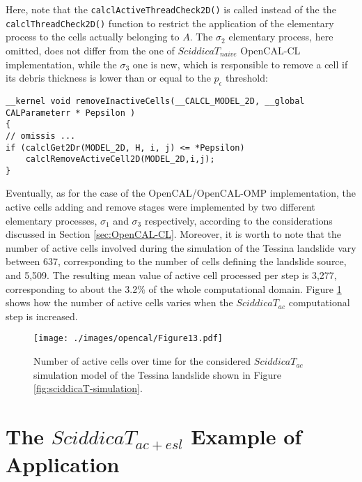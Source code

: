 \noindent Here, note that the \verb'calclActiveThreadCheck2D()' is
called instead of the the \verb'calclThreadCheck2D()' function to
restrict the application of the elementary process to the cells
actually belonging to $A$. The $\sigma_2$ elementary process, here
omitted, does not differ from the one of $SciddicaT_{naive}$
OpenCAL-CL implementation, while the $\sigma_3$ one is new, which
is responsible to remove a cell if its debris thickness is lower
than or equal to the $p_\epsilon$ threshold:

\begin{lstlisting}
__kernel void removeInactiveCells(__CALCL_MODEL_2D, __global CALParameterr * Pepsilon )
{
// omissis ...
if (calclGet2Dr(MODEL_2D, H, i, j) <= *Pepsilon)
	calclRemoveActiveCell2D(MODEL_2D,i,j);
}
\end{lstlisting}

Eventually, as for the case of the OpenCAL/OpenCAL-OMP
implementation, the active cells adding and remove stages were
implemented by two different elementary processes, $\sigma_1$ and
$\sigma_3$ respectively, according to the considerations discussed
in Section \ref{sec:OpenCAL-CL}. Moreover, it is worth to note
that the number of active cells involved during the simulation of
the Tessina landslide vary between 637, corresponding to the
number of cells defining the landslide source, and 5,509. The
resulting mean value of active cell processed per step is 3,277,
corresponding to about the 3.2\% of the whole computational
domain. Figure \ref{gr:active_cells_count} shows how the number of
active cells varies when the $SciddicaT_{ac}$ computational step
is increased.

\begin{figure}
	\begin{center}
		\texttt{[image: ./images/opencal/Figure13.pdf]}
		\caption{Number of active cells over time for the considered $SciddicaT_{ac}$ simulation model of the Tessina landslide shown in Figure \ref{fig:sciddicaT-simulation}.}
		\label{gr:active_cells_count}
	\end{center}
\end{figure}

\section{The $SciddicaT_{ac+esl}$ Example of Application}
\label{sec:SciddicaT-ac+esl}

